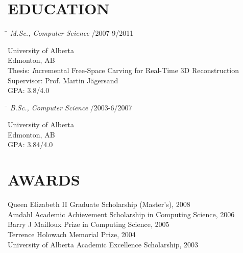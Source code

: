 \documentclass{res}
\begin{document}
\begin{resume}
\section{EDUCATION}
    \vspace{-0.1in}
    \begin{tabbing}
    \hspace{5.15in}\= \kill  %
    \textit{M.Sc., Computer Science} /2007-9/2011
    \end{tabbing}\vspace{-22pt}  %
    University of Alberta\\
    Edmonton, AB\\
    \hspace*{2.5em} Thesis: {\textit Incremental Free-Space Carving for Real-Time 3D Reconstruction}\\
    \hspace*{2.5em} Supervisor: Prof. Martin J{\"a}gersand\\
    \hspace*{2.5em} GPA: 3.8/4.0

    \vspace{-0.1in}
    \begin{tabbing}
    \hspace{5.15in}\= \kill  %
    \textit{B.Sc., Computer Science} /2003-6/2007
    \end{tabbing}\vspace{-22pt}  %
    University of Alberta\\
    Edmonton, AB\\
    \hspace*{2.5em} GPA: 3.84/4.0


\section{AWARDS}
    \vspace*{0.5ex}
    Queen Elizabeth II Graduate Scholarship (Master's), 2008\\
    Amdahl Academic Achievement Scholarship in Computing Science, 2006\\
    Barry J Mailloux Prize in Computing Science, 2005\\
    Terrence Holowach Memorial Prize, 2004\\
    University of Alberta Academic Excellence Scholarship, 2003



\end{resume}
\end{document}
